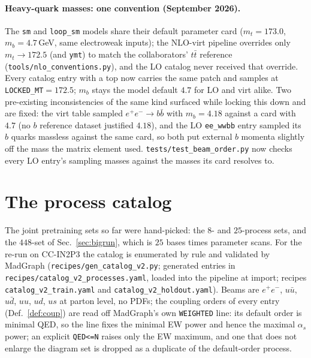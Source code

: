 \documentclass[11pt]{article}
\newcommand{\code}[1]{\texttt{#1}}
\begin{document}
\paragraph{Heavy-quark masses: one convention (September 2026).} The \code{sm} and
\code{loop\_sm} models share their default parameter card ($m_t=173.0$, $m_b=4.7$\,GeV, same
electroweak inputs); the NLO-virt pipeline overrides only $m_t\to172.5$ (and \code{ymt}) to
match the collaborators' $t\bar t$ reference (\code{tools/nlo\_conventions.py}), and the LO
catalog never received that override. Every catalog entry with a top now carries the same
patch and samples at \code{LOCKED\_MT}$=172.5$; $m_b$ stays the model default $4.7$ for LO
and virt alike. Two pre-existing inconsistencies of the same kind surfaced while locking
this down and are fixed: the virt table sampled $e^+e^-\to b\bar b$ with $m_b=4.18$ against
a card with $4.7$ (no $b$ reference dataset justified $4.18$), and the LO \code{ee\_wwbb}
entry sampled its $b$ quarks massless against the same card, so both put external $b$
momenta slightly off the mass the matrix element used. \code{tests/test\_beam\_order.py}
now checks every LO entry's sampling masses against the masses its card resolves to.

\section{The process catalog}\label{sec:catalog}
The joint pretraining sets so far were hand-picked: the $8$- and $25$-process sets, and the
$448$-set of Sec.~\ref{sec:bigrun}, which is $25$ bases times parameter scans. For the re-run
on CC-IN2P3 the catalog is enumerated by rule and validated by MadGraph
(\code{recipes/gen\_catalog\_v2.py}; generated entries in
\code{recipes/catalog\_v2\_processes.yaml}, loaded into the pipeline at import; recipes
\code{catalog\_v2\_train.yaml} and \code{catalog\_v2\_holdout.yaml}). Beams are $e^+e^-$,
$u\bar u$, $u\bar d$, $uu$, $ud$, $us$ at parton level, no PDFs; the coupling orders of every
entry (Def.~\ref{def:coup}) are read off MadGraph's own \code{WEIGHTED} line: its default
order is minimal QED, so the line fixes the minimal EW power and hence the maximal $\alpha_s$
power; an explicit \code{QED<=N} raises only the EW maximum, and one that does not enlarge the
diagram set is dropped as a duplicate of the default-order process.
\end{document}
